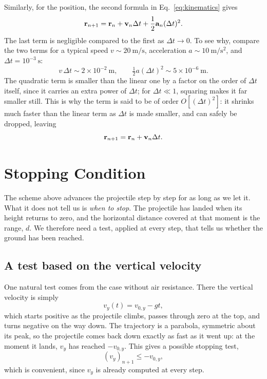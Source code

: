 \documentclass[11pt]{article}
\begin{document}
Similarly, for the position, the second formula in
Eq.~\eqref{eq:kinematics} gives
\begin{equation}
    \vb{r}_{n+1} = \vb{r}_n + \vb{v}_n \Delta t +
    \frac{1}{2}\vb{a}_n(\Delta t)^2.
\end{equation}
The last term is negligible compared to the first as $\Delta t \to
0$. To see why, compare the two terms for a typical speed
$v \sim 20\ \mathrm{m/s}$, acceleration $a \sim 10\ \mathrm{m/s^2}$,
and $\Delta t = 10^{-3}\ \mathrm{s}$:
\begin{equation}
    v\,\Delta t \sim 2\times10^{-2}\ \mathrm{m},
    \qquad
    \tfrac{1}{2}a(\Delta t)^2 \sim 5\times10^{-6}\ \mathrm{m}.
\end{equation}
The quadratic term is smaller than the linear one by a factor on the
order of $\Delta t$ itself, since it carries an extra power of
$\Delta t$; for $\Delta t \ll 1$, squaring makes it far smaller still.
This is why the term is said to be of order $O[(\Delta t)^2]$: it
shrinks much faster than the linear term as $\Delta t$ is made
smaller, and can safely be dropped, leaving
\begin{equation}
    \vb{r}_{n+1} = \vb{r}_n + \vb{v}_n \Delta t.
\end{equation}

\section{Stopping Condition}

The scheme above advances the projectile step by step for as long as we
let it. What it does not tell us is \emph{when to stop}. The projectile
has landed when its height returns to zero, and the horizontal distance
covered at that moment is the range, $d$. We therefore need a test,
applied at every step, that tells us whether the ground has been
reached.

\subsection{A test based on the vertical velocity}

One natural test comes from the case without air resistance. There the
vertical velocity is simply
\begin{equation}
    v_y(t) = v_{0,y} - g t,
\end{equation}
which starts positive as the projectile climbs, passes through zero at
the top, and turns negative on the way down. The trajectory is a
parabola, symmetric about its peak, so the projectile comes back down
exactly as fast as it went up: at the moment it lands, $v_y$ has
reached $-v_{0,y}$. This gives a possible stopping test,
\begin{equation}
    (v_y)_{n+1} \leq -v_{0,y},
    \label{eq:stop_vy}
\end{equation}
which is convenient, since $v_y$ is already computed at every step.
\end{document}
